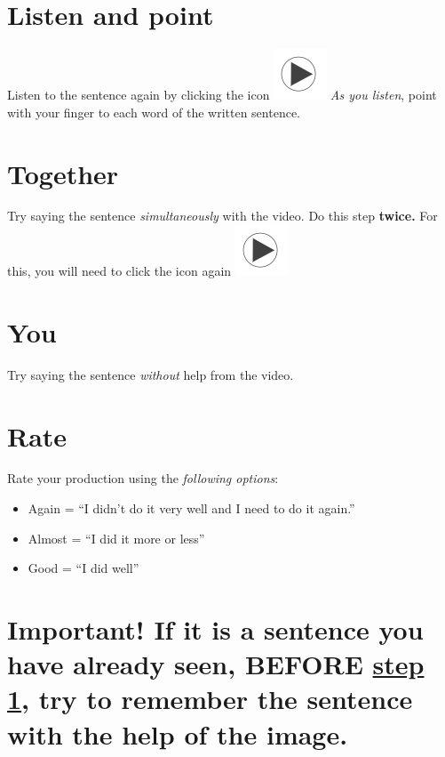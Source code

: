 \documentclass[
]{book}
\begin{document}
\section{Listen and point}\label{listen-and-point}

Listen to the sentence again by clicking the icon \includegraphics{images/play_icon.png} \emph{As you listen}, point with your finger to each word of the written sentence.

\section{Together}\label{together}

Try saying the sentence \emph{simultaneously } with the video. Do this step \textbf{twice.} For this, you will need to click the icon again \includegraphics{images/play_icon.png}

\section{You}\label{you}

Try saying the sentence \emph{without} help from the video.

\section{Rate}\label{rate}

Rate your production using the \emph{following options}:

\begin{itemize}
\item
  Again = ``I didn't do it very well and I need to do it again.''
\item
  Almost = ``I did it more or less''
\item
  Good = ``I did well''
\end{itemize}

\section{\texorpdfstring{Important! If it is a sentence you have \textbf{already} seen, BEFORE \hyperref[cross_6]{step 1}, try to remember the sentence with the help of the image.}{Important! If it is a sentence you have already seen, BEFORE step 1, try to remember the sentence with the help of the image.}}\label{important-if-it-is-a-sentence-you-have-already-seen-before-step-1-try-to-remember-the-sentence-with-the-help-of-the-image.}
\end{document}
